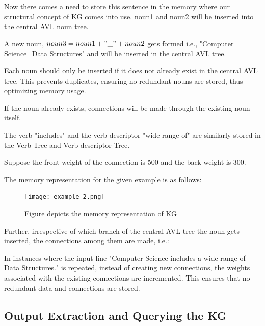 \documentclass[conference]{IEEEtran}
\begin{document}
Now there comes a need to store this sentence in the memory where our structural concept
of KG comes into use.
noun1 and noun2 will be inserted into the central AVL noun
tree.

A new noun, $noun3 = noun1 + "\_" + noun2$ gets formed i.e., "Computer Science\_Data Structures"
and will be inserted in the central AVL tree.

Each noun should only be inserted if it does not already exist in the central AVL tree. 
This prevents duplicates, ensuring no redundant nouns are stored, thus optimizing memory usage.

If the noun already exists, connections will be made through the existing noun itself.

The verb "includes" and the verb descriptor "wide range of" are similarly stored in the Verb Tree and Verb descriptor Tree.

Suppose the front weight of the connection is 500 and the back weight is 300.

The memory representation for the given example is as follows: 

\begin{figure}[htbp]
\centerline{\texttt{[image: example\_2.png]}}
\caption{Figure depicts the memory representation of KG}
\label{fig}
\end{figure}

Further, irrespective of which branch of the central AVL tree the noun gets inserted, 
the connections among them are made, i.e.:



In instances where the input line "Computer Science includes a wide range of Data Structures." is 
repeated, instead of creating new connections, the weights associated with the existing connections 
are incremented. This ensures that no redundant data and connections are stored.


\subsection{\textbf{Output Extraction and Querying the KG}}
\end{document}

